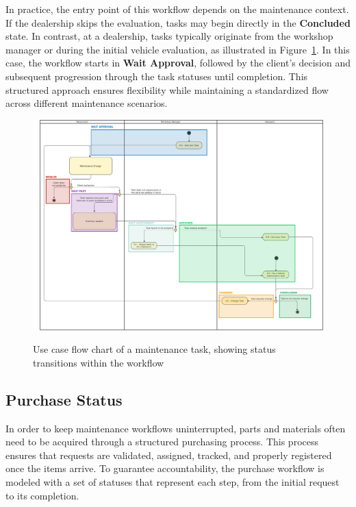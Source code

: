 In practice, the entry point of this workflow depends on the maintenance context. If the dealership skips the evaluation, tasks may begin directly in the \textbf{Concluded} state. In contrast, at a dealership, tasks typically originate from the workshop manager or during the initial vehicle evaluation, as illustrated in Figure~\ref{fig:maintenanceTaskUseCase}. In this case, the workflow starts in \textbf{Wait Approval}, followed by the client's decision and subsequent progression through the task statuses until completion. This structured approach ensures flexibility while maintaining a standardized flow across different maintenance scenarios.



\begin{figure}[h]
  \caption{Use case flow chart of a maintenance task, showing status transitions within the workflow}
  \centering
  \includegraphics[width=\textwidth]{figs/Status/MaintenanceTask/UseCaseStatus}
  \label{fig:maintenanceTaskUseCase}
\end{figure}

\subsection{Purchase Status} 

In order to keep maintenance workflows uninterrupted, parts and materials often need to be acquired through a structured purchasing process. This process ensures that requests are validated, assigned, tracked, and properly registered once the items arrive. To guarantee accountability, the purchase workflow is modeled with a set of statuses that represent each step, from the initial request to its completion.

